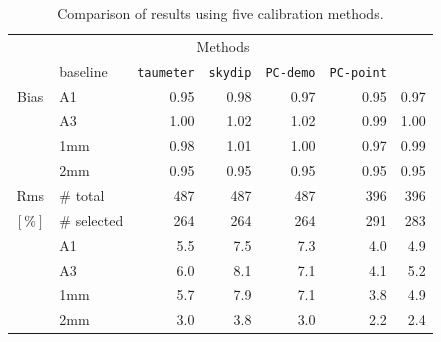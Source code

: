 \begin{table}[!htbp]
\begin{center}
\begin{tabular}{clrrrrr}
  \hline\hline
  \noalign{\smallskip}
  \multicolumn{2}{c}{}  &  \multicolumn{5}{c}{Methods} \\\cline{3-7}
  \noalign{\smallskip}
  \multicolumn{2}{c}{Characteristics} &  baseline  & {\small {\tt taumeter}}  & {\small {\tt skydip}}  &  {\small {\tt PC-demo}} & {\small {\tt PC-point}} \\
  \hline
  \noalign{\smallskip}
  Bias &  A1            &   0.95   &  0.98    &  0.97    &   0.95    &  0.97  \\
       &  A3            &   1.00   &  1.02    &  1.02    &   0.99    &  1.00  \\
       &  1mm           &   0.98   &  1.01    &  1.00    &   0.97    &  0.99  \\
       &  2mm           &   0.95   &  0.95    &  0.95    &   0.95    &  0.95  \\
  \hline
  \noalign{\smallskip}
  Rms  &  $\#$ total    &   487    &    487   &    487    &    396    &  396 \\
  $[\%]$ &  $\#$ selected &   264    &    264   &    264    &    291    &  283 \\
       &  A1            &   5.5    &    7.5   &    7.3    &    4.0    &  4.9 \\
       &  A3            &   6.0    &    8.1   &    7.1    &    4.1    &  5.2 \\
       &  1mm           &   5.7    &    7.9   &    7.1    &    3.8    &  4.9 \\
       &  2mm           &   3.0    &    3.8   &    3.0    &    2.2    &  2.4 \\
\hline
\end{tabular}
\caption[Comparison of calibration results using five
  methods]{Comparison of results using five calibration methods.}
\label{tab:Calibration_results_all}
\end{center}
\end{table}

